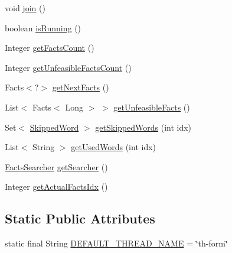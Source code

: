 \begin{DoxyCompactItemize}
\item 
void \hyperlink{classit_1_1emarolab_1_1cagg_1_1core_1_1evaluation_1_1inputFormatting_1_1ThreadedInputFormatter_a353b8756f06f5a73f7fc37c16f6ee6f3}{join} ()
\item 
boolean \hyperlink{classit_1_1emarolab_1_1cagg_1_1core_1_1evaluation_1_1inputFormatting_1_1ThreadedInputFormatter_a23615071a29a66297f02f2e85251e909}{is\-Running} ()
\item 
Integer \hyperlink{classit_1_1emarolab_1_1cagg_1_1core_1_1evaluation_1_1inputFormatting_1_1ThreadedInputFormatter_a05910063d33352cf5a37eea067fb4c93}{get\-Facts\-Count} ()
\item 
Integer \hyperlink{classit_1_1emarolab_1_1cagg_1_1core_1_1evaluation_1_1inputFormatting_1_1ThreadedInputFormatter_ae87d6efcf03eee34530340cbd4de0c4b}{get\-Unfeasible\-Facts\-Count} ()
\item 
Facts$<$?$>$ \hyperlink{classit_1_1emarolab_1_1cagg_1_1core_1_1evaluation_1_1inputFormatting_1_1ThreadedInputFormatter_a46c738b096e8500ec0c09d2e0cb72001}{get\-Next\-Facts} ()
\item 
List$<$ Facts$<$ Long $>$ $>$ \hyperlink{classit_1_1emarolab_1_1cagg_1_1core_1_1evaluation_1_1inputFormatting_1_1ThreadedInputFormatter_af5951a1f0b1821d4e6cd9d4fe9fcdfa3}{get\-Unfeasible\-Facts} ()
\item 
Set$<$ \hyperlink{classit_1_1emarolab_1_1cagg_1_1core_1_1evaluation_1_1inputFormatting_1_1ThreadedInputFormatter_1_1SkippedWord}{Skipped\-Word} $>$ \hyperlink{classit_1_1emarolab_1_1cagg_1_1core_1_1evaluation_1_1inputFormatting_1_1ThreadedInputFormatter_a18d1dbedf9d7cd0fead2b34b27e26243}{get\-Skipped\-Words} (int idx)
\item 
List$<$ String $>$ \hyperlink{classit_1_1emarolab_1_1cagg_1_1core_1_1evaluation_1_1inputFormatting_1_1ThreadedInputFormatter_a2a5923e491bec94cd64d0d5d1473f861}{get\-Used\-Words} (int idx)
\item 
\hyperlink{classit_1_1emarolab_1_1cagg_1_1core_1_1evaluation_1_1inputFormatting_1_1ThreadedInputFormatter_1_1FactsSearcher}{Facts\-Searcher} \hyperlink{classit_1_1emarolab_1_1cagg_1_1core_1_1evaluation_1_1inputFormatting_1_1ThreadedInputFormatter_a9f0f81b6f918b0ae97483a3f0cfdb8bd}{get\-Searcher} ()
\item 
Integer \hyperlink{classit_1_1emarolab_1_1cagg_1_1core_1_1evaluation_1_1inputFormatting_1_1ThreadedInputFormatter_af2c23a357ce22d5c30950403da6f2206}{get\-Actual\-Facts\-Idx} ()
\end{DoxyCompactItemize}
\subsection*{Static Public Attributes}
\begin{DoxyCompactItemize}
\item 
static final String \hyperlink{classit_1_1emarolab_1_1cagg_1_1core_1_1evaluation_1_1inputFormatting_1_1ThreadedInputFormatter_a87e31b351f0ca7790289311e01bb6f65}{D\-E\-F\-A\-U\-L\-T\-\_\-\-T\-H\-R\-E\-A\-D\-\_\-\-N\-A\-M\-E} = \char`\"{}th-\/form\char`\"{}
\end{DoxyCompactItemize}
